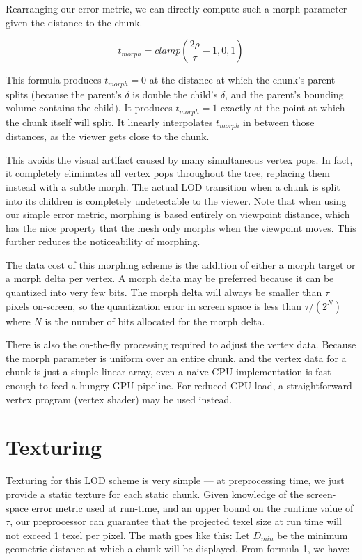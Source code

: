 \documentclass[12pt]{article}
\begin{document}
Rearranging our error metric, we can directly compute such a morph
parameter given the distance to the chunk.

\begin{equation}
t_{morph} = clamp(\frac{ 2 \rho }{ \tau } - 1, 0, 1)
\label{eqtmorph}
\end{equation}
 
This formula produces $t_{morph} = 0$ at the distance at which the
chunk's parent splits (because the parent's $\delta$ is double the
child's $\delta$, and the parent's bounding volume contains the child).
It produces $t_{morph} = 1$ exactly at the point at which the chunk
itself will split.  It linearly interpolates $t_{morph}$ in between
those distances, as the viewer gets close to the chunk.
 
This avoids the visual artifact caused by many simultaneous vertex
pops.  In fact, it completely eliminates all vertex pops throughout
the tree, replacing them instead with a subtle morph.  The actual LOD
transition when a chunk is split into its children is completely
undetectable to the viewer.  Note that when using our simple error
metric, morphing is based entirely on viewpoint distance, which has
the nice property that the mesh only morphs when the viewpoint moves.
This further reduces the noticeability of morphing.
 
The data cost of this morphing scheme is the addition of either a
morph target or a morph delta per vertex.  A morph delta may be
preferred because it can be quantized into very few bits.  The morph
delta will always be smaller than $\tau$ pixels on-screen, so the
quantization error in screen space is less than $\tau / (2^N)$
where $N$ is the number of bits allocated for the morph delta.
 
There is also the on-the-fly processing required to adjust the vertex
data.  Because the morph parameter is uniform over an entire chunk,
and the vertex data for a chunk is just a simple linear array, even a
naive CPU implementation is fast enough to feed a hungry GPU pipeline.
For reduced CPU load, a straightforward vertex program (vertex shader)
may be used instead.
 
\section{Texturing}

Texturing for this LOD scheme is very simple --- at preprocessing time,
we just provide a static texture for each static chunk.  Given
knowledge of the screen-space error metric used at run-time, and an
upper bound on the runtime value of $\tau$, our preprocessor can
guarantee that the projected texel size at run time will not exceed 1
texel per pixel.  The math goes like this: Let $D_{min}$ be the
minimum geometric distance at which a chunk will be displayed.  From
formula 1, we have:
 
\end{document}
